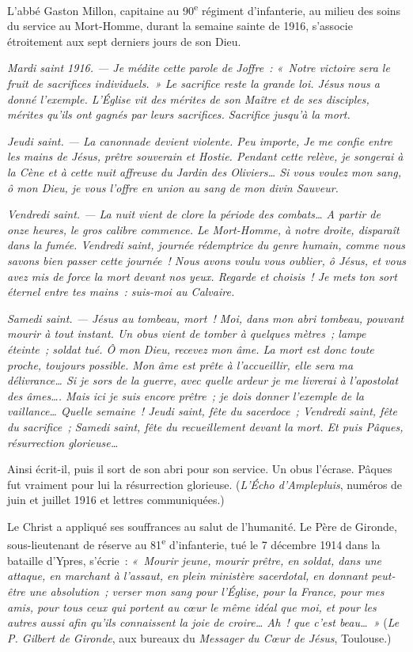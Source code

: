 \documentclass[french,twoside]{book} %
\begin{document}
L’abbé Gaston Millon, capitaine au 90\textsuperscript{e} régiment d’infanterie, au milieu des soins du service au Mort-Homme, durant la semaine sainte de 1916, s’associe étroitement aux sept derniers jours de son Dieu.‌\par
\par
{\itshape Mardi saint 1916. — Je médite cette parole de Joffre : « Notre victoire sera le fruit de sacrifices individuels. » Le sacrifice reste la grande loi. Jésus nous a donné l’exemple. L’Église vit des mérites de son Maître et de ses disciples, mérites qu’ils ont gagnés par leurs sacrifices. Sacrifice jusqu’à la mort.}\par
{\itshape Jeudi saint. — La canonnade devient violente. Peu importe, Je me confie entre les mains de Jésus, prêtre souverain et Hostie. Pendant cette relève, je songerai à la Cène et à cette nuit affreuse du Jardin des Oliviers… Si vous voulez mon sang, ô mon Dieu, je vous l’offre en union au sang de mon divin Sauveur.}\par
{\itshape Vendredi saint. — La nuit vient de clore la période des combats… A partir de onze heures, le gros calibre commence. Le Mort-Homme, à notre droite, disparaît dans la fumée. Vendredi saint, journée rédemptrice du genre humain, comme nous savons bien passer cette journée ! Nous avons voulu vous oublier, ô Jésus, et vous avez mis de force la mort devant nos yeux. Regarde et choisis ! Je mets ton sort éternel entre tes mains : suis-moi au Calvaire.}\par
{\itshape Samedi saint. — Jésus au tombeau, mort ! Moi, dans mon abri tombeau, pouvant mourir à tout instant. Un obus vient de tomber à quelques mètres ; lampe éteinte ; soldat tué. Ô mon Dieu, recevez mon âme. La mort est donc toute proche, toujours possible. Mon âme est prête à l’accueillir, elle sera ma délivrance… Si je sors de la guerre, avec quelle ardeur je me livrerai à l’apostolat des âmes…. Mais ici je suis encore prêtre ; je dois donner l’exemple de la vaillance… Quelle semaine ! Jeudi saint, fête du sacerdoce ; Vendredi saint, fête du sacrifice ; Samedi saint, fête du recueillement devant la mort. Et puis Pâques, résurrection glorieuse…}\par
\par
Ainsi écrit-il, puis il sort de son abri pour son service. Un obus l’écrase. Pâques fut vraiment pour lui la résurrection glorieuse. ({\itshape L’Écho d’Amplepluis}, numéros de juin et juillet 1916 et lettres communiquées.)‌\par
Le Christ a appliqué ses souffrances au salut de l’humanité. Le Père de Gironde, sous-lieutenant de réserve au 81\textsuperscript{e} d’infanterie, tué le 7 décembre 1914 dans la bataille d’Ypres, s’écrie : \emph{« Mourir jeune, mourir prêtre, en soldat, dans une attaque, en marchant à l’assaut, en plein ministère sacerdotal, en donnant peut-être une absolution ; verser mon sang pour l’Église, pour la France, pour mes amis, pour tous ceux qui portent au cœur le même idéal que moi, et pour les autres aussi afin qu’ils connaissent la joie de croire… Ah ! que c’est beau… »} ({\itshape Le P. Gilbert de Gironde}, aux bureaux du {\itshape Messager du Cœur de Jésus}, Toulouse.)\par
\end{document}
